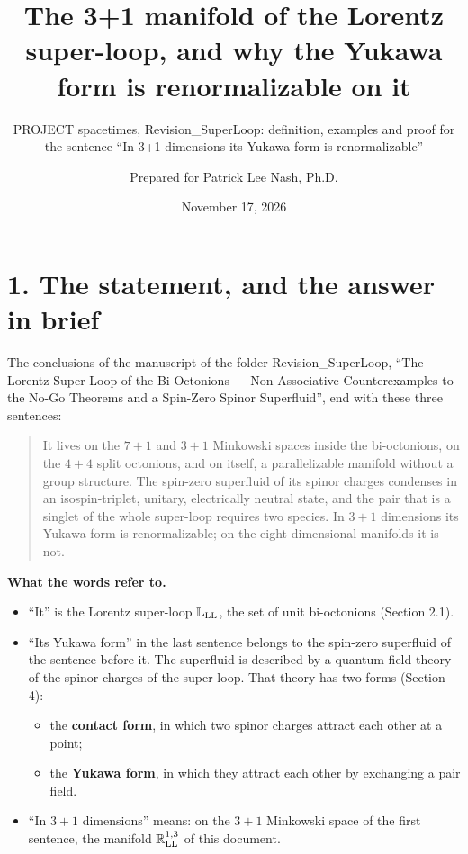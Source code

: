 \documentclass[
  10pt,
]{article}
\title{The 3+1 manifold of the Lorentz super-loop, and why the Yukawa
form is renormalizable on it}
\subtitle{PROJECT spacetimes, Revision\_SuperLoop: definition, examples
and proof for the sentence ``In 3+1 dimensions its Yukawa form is
renormalizable''}
\author{Prepared for Patrick Lee Nash, Ph.D.}
\date{November 17, 2026}
\providecommand{\tightlist}{%
  \setlength{\itemsep}{0pt}\setlength{\parskip}{0pt}}
\begin{document}
\maketitle

\hypertarget{the-statement-and-the-answer-in-brief}{%
\section{1. The statement, and the answer in
brief}\label{the-statement-and-the-answer-in-brief}}

The conclusions of the manuscript of the folder Revision\_SuperLoop,
``The Lorentz Super-Loop of the Bi-Octonions --- Non-Associative
Counterexamples to the No-Go Theorems and a Spin-Zero Spinor
Superfluid'', end with these three sentences:

\begin{quote}
It lives on the \(7+1\) and \(3+1\) Minkowski spaces inside the
bi-octonions, on the \(4+4\) split octonions, and on itself, a
parallelizable manifold without a group structure. The spin-zero
superfluid of its spinor charges condenses in an isospin-triplet,
unitary, electrically neutral state, and the pair that is a singlet of
the whole super-loop requires two species. In \(3+1\) dimensions its
Yukawa form is renormalizable; on the eight-dimensional manifolds it is
not.
\end{quote}

\textbf{What the words refer to.}

\begin{itemize}
\tightlist
\item
  ``It'' is the Lorentz super-loop \(\mathbb L_{\rm LL}\), the set of
  unit bi-octonions (Section 2.1).
\item
  ``Its Yukawa form'' in the last sentence belongs to the spin-zero
  superfluid of the sentence before it. The superfluid is described by a
  quantum field theory of the spinor charges of the super-loop. That
  theory has two forms (Section 4):

  \begin{itemize}
  \tightlist
  \item
    the \textbf{contact form}, in which two spinor charges attract each
    other at a point;
  \item
    the \textbf{Yukawa form}, in which they attract each other by
    exchanging a pair field.
  \end{itemize}
\item
  ``In \(3+1\) dimensions'' means: on the \(3+1\) Minkowski space of the
  first sentence, the manifold \(\mathbb R^{1,3}_{\rm LL}\) of this
  document.
\end{itemize}
\end{document}
